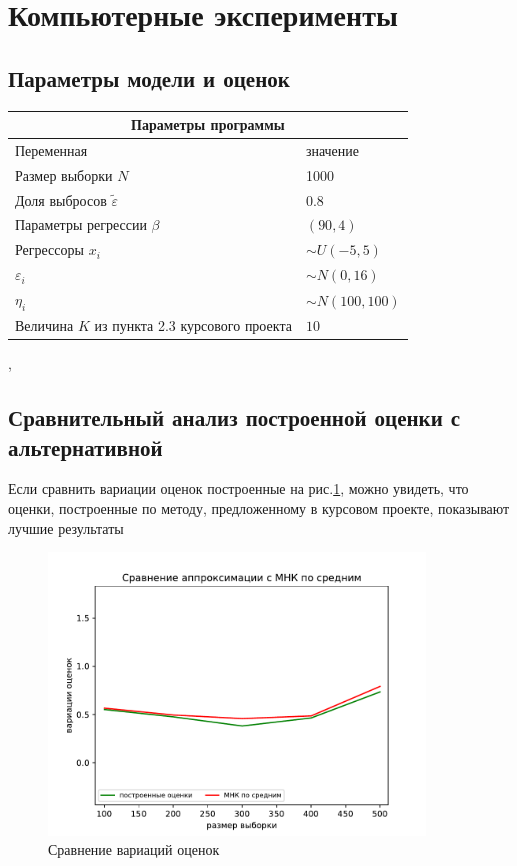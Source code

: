 \newpage
\section{Компьютерные эксперименты}
\subsection{Параметры модели и оценок}
\begin{center}
    \begin{tabular}{|p{5cm}|p{5cm}|}
        \hline
        \multicolumn{2}{|c|}{Параметры программы} \\
        \hline
        Переменная&значение\\
        \hline
        Размер выборки $N$& 1000\\
        \hline
        Доля выбросов $\widetilde{\varepsilon}$& 0.8\\
        \hline
        Параметры регрессии $\beta$& $(90,4)$\\
        \hline
        Регрессоры $x_i$ & $\sim U(-5,5)$\\
        \hline
        $\varepsilon_i$&$\sim N(0,16)$\\
        \hline
        $\eta_i$&$\sim N(100,100)$\\
        \hline
        Величина $K$ из пункта 2.3 курсового проекта &$10$\\
        \hline
    \end{tabular},
\end{center}

\subsection{Сравнительный анализ построенной оценки с альтернативной}
Если сравнить вариации оценок построенные на рис.\ref{pic1}, можно увидеть, что оценки, построенные по методу, предложенному в курсовом проекте, показывают лучшие результаты
\begin{figure}[h!]
    \centering
    \includegraphics[width=100mm]{../images/OLS_GEM.pdf}
    \caption{Сравнение вариаций оценок\label{overflow}}
    \label{pic1}
\end{figure}

